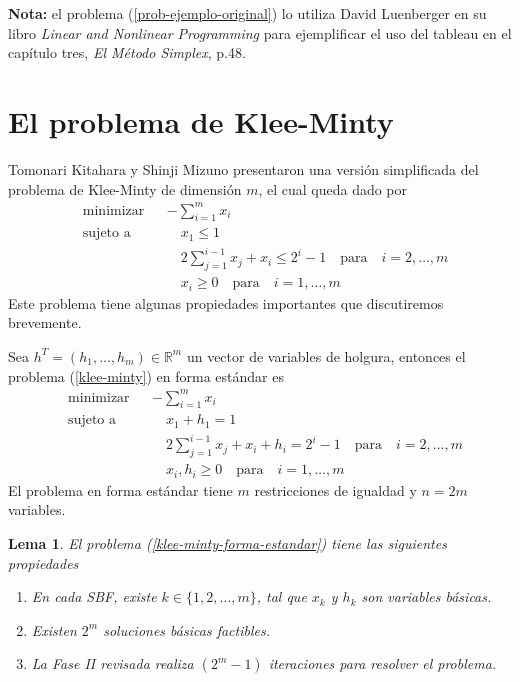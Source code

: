 \documentclass[titlepage]{article}
\newcommand{\Real}{\mathbb{R}}
\newtheorem{mi_lema}{Lema}
\begin{document}
\noindent\textbf{Nota:} el problema (\ref{prob-ejemplo-original}) lo utiliza David Luenberger en su libro \textit{Linear and Nonlinear Programming} para ejemplificar el uso del tableau en el capítulo tres, \textit{El Método Simplex}, p.48.

\section{El problema de Klee-Minty}

Tomonari Kitahara y Shinji Mizuno presentaron una versión simplificada del problema de Klee-Minty de dimensión $m$, el cual queda dado por 
\begin{equation} \label{klee-minty}
    \begin{aligned} 
        & \text{minimizar}  && -\textstyle\sum_{i = 1}^{m} x_i \\
        & \text{sujeto a}   && \quad x_1 \leq 1 \\
        &                   && \quad 2\textstyle\sum_{j = 1}^{i-1} x_j + x_i \leq 2^i - 1 \quad \text{para} \quad i = 2,\dots,m \\
        &                   && \quad x_i \geq 0 \quad \text{para} \quad i = 1,\dots,m
    \end{aligned}
\end{equation}
Este problema tiene algunas propiedades importantes que discutiremos brevemente.

Sea $h^T = (h_1, \dots, h_m) \in \Real^m$ un vector de variables de holgura, entonces el problema (\ref{klee-minty}) en forma estándar es \hspace*{\fill} \null 
\begin{equation} \label{klee-minty-forma-estandar}
    \begin{aligned}
        & \text{minimizar}  && -\textstyle\sum_{i = 1}^{m} x_i  \\
        & \text{sujeto a}   && \quad x_1 + h_1 = 1 \\
        &                   && \quad 2\textstyle\sum_{j = 1}^{i-1} x_j + x_i + h_i = 2^i - 1 \quad \text{para} \quad i = 2,\dots,m \\
        &                   && \quad x_i, h_i \geq 0 \quad \text{para} \quad i = 1,\dots,m
    \end{aligned}
\end{equation}
El problema en forma estándar tiene $m$ restricciones de igualdad y $n = 2m$ variables.
\begin{mi_lema} \label{lema-klee-minty}
    El problema (\ref{klee-minty-forma-estandar}) tiene las siguientes propiedades
    \begin{enumerate}
        \item En cada SBF, existe $k \in \{1, 2, \dots, m\}$, tal que $x_k$ y $h_k$ son variables básicas.
        \item Existen $2^m$ soluciones básicas factibles.
        \item La Fase II revisada realiza $(2^m - 1)$ iteraciones para resolver el problema.
    \end{enumerate}
\end{mi_lema}
\end{document}
